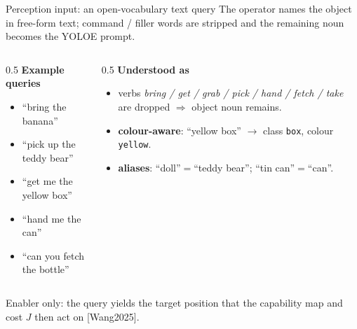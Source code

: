 \documentclass[aspectratio=169]{beamer}
\begin{document}
\begin{frame}{Perception input: an open-vocabulary text query}
  \footnotesize
  The operator names the object in free-form text; command / filler words are
  stripped and the remaining noun becomes the YOLOE prompt.
  \begin{columns}[T]
    \begin{column}{0.5\textwidth}
      \textbf{Example queries}
      \begin{itemize}
        \item ``bring the banana''
        \item ``pick up the teddy bear''
        \item ``get me the yellow box''
        \item ``hand me the can''
        \item ``can you fetch the bottle''
      \end{itemize}
    \end{column}
    \begin{column}{0.5\textwidth}
      \textbf{Understood as}
      \begin{itemize}
        \item verbs \emph{bring / get / grab / pick / hand / fetch / take} are
              dropped $\Rightarrow$ object noun remains.
        \item \textbf{colour-aware}: ``yellow box'' $\to$ class \texttt{box}, colour
              \texttt{yellow}.
        \item \textbf{aliases}: ``doll''$=$``teddy bear''; ``tin can''$=$``can''.
      \end{itemize}
    \end{column}
  \end{columns}
  \vspace{0.4em}
  {\scriptsize Enabler only: the query yields the target position that the
  capability map and cost $J$ then act on [Wang2025].}
\end{frame}
\end{document}

